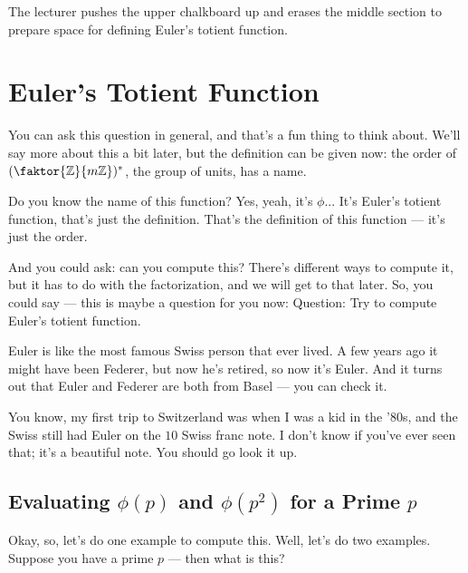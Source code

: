\begin{note}
The lecturer pushes the upper chalkboard up and erases the middle section to prepare space for defining Euler's totient function.
\end{note}

\section{Euler's Totient Function}

\begin{speech}[00:10:36 - 00:12:03]
You can ask this question in general, and that's a fun thing to think about. We'll say more about this a bit later, but the definition can be given now:  the order of $(\faktor{\mathbb{Z}}{m\mathbb{Z}})^*$, the group of units, has a name.

Do you know the name of this function? Yes, yeah, it's $\phi$... It's Euler's totient function, that's just the definition. That's the definition of this function --- it's just the order.

And you could ask: can you compute this? There's different ways to compute it, but it has to do with the factorization, and we will get to that later. So, you could say --- this is maybe a question for you now:  Question: Try to compute Euler's totient function.

Euler is like the most famous Swiss person that ever lived. A few years ago it might have been Federer, but now he's retired, so now it's Euler. And it turns out that Euler and Federer are both from Basel --- you can check it.

You know, my first trip to Switzerland was when I was a kid in the '80s, and the Swiss still had Euler on the $10$ Swiss franc note. I don't know if you've ever seen that; it's a beautiful note. You should go look it up.
\end{speech}

\subsection{Evaluating \texorpdfstring{$\phi(p)$}{phi(p)} and \texorpdfstring{$\phi(p^2)$}{phi(p\texttwosuperior)} for a Prime \texorpdfstring{$p$}{p}}

\begin{speech}[00:12:03 - 00:12:15]
Okay, so, let's do one example to compute this. Well, let's do two examples. Suppose you have a prime $p$  --- then what is this?
\end{speech}

